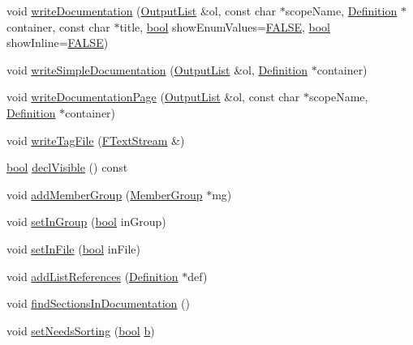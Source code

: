 \begin{DoxyCompactItemize}
\item 
void \hyperlink{class_member_list_a9278465bcab183357cfcf1048b80abcf}{write\+Documentation} (\hyperlink{class_output_list}{Output\+List} \&ol, const char $\ast$scope\+Name, \hyperlink{class_definition}{Definition} $\ast$container, const char $\ast$title, \hyperlink{qglobal_8h_a1062901a7428fdd9c7f180f5e01ea056}{bool} show\+Enum\+Values=\hyperlink{qglobal_8h_a10e004b6916e78ff4ea8379be80b80cc}{F\+A\+L\+S\+E}, \hyperlink{qglobal_8h_a1062901a7428fdd9c7f180f5e01ea056}{bool} show\+Inline=\hyperlink{qglobal_8h_a10e004b6916e78ff4ea8379be80b80cc}{F\+A\+L\+S\+E})
\item 
void \hyperlink{class_member_list_a276d3226e9a4cfb2dd121171f71ccd33}{write\+Simple\+Documentation} (\hyperlink{class_output_list}{Output\+List} \&ol, \hyperlink{class_definition}{Definition} $\ast$container)
\item 
void \hyperlink{class_member_list_a033f3f3b8e09b52c7450c2bba36c9677}{write\+Documentation\+Page} (\hyperlink{class_output_list}{Output\+List} \&ol, const char $\ast$scope\+Name, \hyperlink{class_definition}{Definition} $\ast$container)
\item 
void \hyperlink{class_member_list_ad088848472057e874fc8dde92172b9e8}{write\+Tag\+File} (\hyperlink{class_f_text_stream}{F\+Text\+Stream} \&)
\item 
\hyperlink{qglobal_8h_a1062901a7428fdd9c7f180f5e01ea056}{bool} \hyperlink{class_member_list_adb602906fc4710d0f8ce23f14ed6e497}{decl\+Visible} () const 
\item 
void \hyperlink{class_member_list_adc15114590d159b32413338d71ad9de9}{add\+Member\+Group} (\hyperlink{class_member_group}{Member\+Group} $\ast$mg)
\item 
void \hyperlink{class_member_list_a48603d9735ed6f2bd45823021871b3ec}{set\+In\+Group} (\hyperlink{qglobal_8h_a1062901a7428fdd9c7f180f5e01ea056}{bool} in\+Group)
\item 
void \hyperlink{class_member_list_ae0019aeb101bfc9f0415e1dd1dabe93e}{set\+In\+File} (\hyperlink{qglobal_8h_a1062901a7428fdd9c7f180f5e01ea056}{bool} in\+File)
\item 
void \hyperlink{class_member_list_a332043aa0d664d063e7fcc0614acbeea}{add\+List\+References} (\hyperlink{class_definition}{Definition} $\ast$def)
\item 
void \hyperlink{class_member_list_aaa55d0c345ead76ca26487b3eaf775d7}{find\+Sections\+In\+Documentation} ()
\item 
void \hyperlink{class_member_list_a8c36bc97e2c74001d67b538ef3568121}{set\+Needs\+Sorting} (\hyperlink{qglobal_8h_a1062901a7428fdd9c7f180f5e01ea056}{bool} \hyperlink{060__command__switch_8tcl_a68bdb74c144118d936931c46f75d4b3e}{b})

\end{DoxyCompactItemize}
